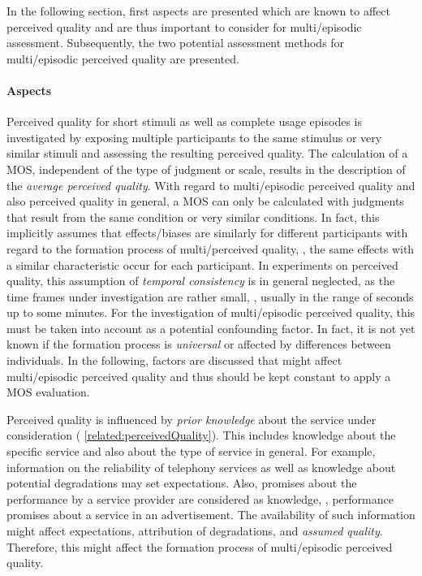 In the following section, first aspects are presented which are known to affect perceived quality and are thus important to consider for multi\-/episodic assessment.
Subsequently, the two potential assessment methods for multi\-/episodic perceived quality are presented. 

\paragraph*{Aspects}
Perceived quality for short stimuli as well as complete usage episodes is investigated by exposing multiple participants to the same stimulus or very similar stimuli and assessing the resulting perceived quality. %
The calculation of a \ac{MOS}, independent of the type of judgment or scale, results in the description of the \emph{average perceived quality}.
With regard to multi\-/episodic perceived quality and also perceived quality in general, a \ac{MOS} can only be calculated with judgments that result from the same condition or very similar conditions.
In fact, this implicitly assumes that effects/biases are similarly for different participants with regard to the formation process of multi\-/perceived quality, \ie, the same effects with a similar characteristic occur for each participant.
In experiments on perceived quality, this assumption of \emph{temporal consistency} is in general neglected, as the time frames under investigation are rather small, \ie, usually in the range of seconds up to some minutes.
For the investigation of multi\-/episodic perceived quality, this must be taken into account as a potential confounding factor.
In fact, it is not yet known if the formation process is \emph{universal} or affected by differences between individuals.
In the following, factors are discussed that might affect multi\-/episodic perceived quality and thus should be kept constant to apply a \ac{MOS} evaluation.

Perceived quality is influenced by \emph{prior knowledge} about the service under consideration (\cf{} \autoref{related:perceivedQuality}).
This includes knowledge about the specific service and also about the type of service in general.
For example, information on the reliability of telephony services as well as knowledge about potential degradations may set expectations.
Also, promises about the performance by a service provider are considered as knowledge, \eg, performance promises about a service in an advertisement.
The availability of such information might affect expectations, attribution of degradations, and \emph{assumed quality}.
Therefore, this might affect the formation process of multi\-/episodic perceived quality.

